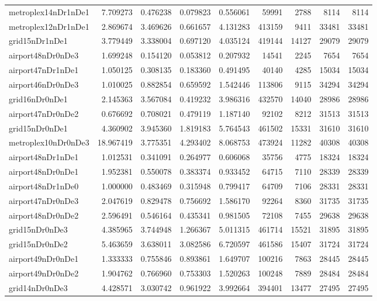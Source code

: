 \begin{longtable}{|l|r|r|r|r|r|r|r|r|}
metroplex14nDr1nDe1 & 7.709273 & 0.476238 & 0.079823 & 0.556061 & 59991 & 2788 & 8114 & 8114 \\
metroplex12nDr1nDe1 & 2.869674 & 3.469626 & 0.661657 & 4.131283 & 413159 & 9411 & 33481 & 33481 \\
grid15nDr1nDe1 & 3.779449 & 3.338004 & 0.697120 & 4.035124 & 419144 & 14127 & 29079 & 29079 \\
airport48nDr0nDe3 & 1.699248 & 0.154120 & 0.053812 & 0.207932 & 14541 & 2245 & 7654 & 7654 \\
airport47nDr1nDe1 & 1.050125 & 0.308135 & 0.183360 & 0.491495 & 40140 & 4285 & 15034 & 15034 \\
airport46nDr0nDe3 & 1.010025 & 0.882854 & 0.659592 & 1.542446 & 113806 & 9115 & 34294 & 34294 \\
grid16nDr0nDe1 & 2.145363 & 3.567084 & 0.419232 & 3.986316 & 432570 & 14040 & 28986 & 28986 \\
airport47nDr0nDe2 & 0.676692 & 0.708021 & 0.479119 & 1.187140 & 92102 & 8212 & 31513 & 31513 \\
grid15nDr0nDe1 & 4.360902 & 3.945360 & 1.819183 & 5.764543 & 461502 & 15331 & 31610 & 31610 \\
metroplex10nDr0nDe3 & 18.967419 & 3.775351 & 4.293402 & 8.068753 & 473924 & 11282 & 40308 & 40308 \\
airport48nDr1nDe1 & 1.012531 & 0.341091 & 0.264977 & 0.606068 & 35756 & 4775 & 18324 & 18324 \\
airport48nDr0nDe1 & 1.952381 & 0.550078 & 0.383374 & 0.933452 & 64715 & 7110 & 28339 & 28339 \\
airport48nDr1nDe0 & 1.000000 & 0.483469 & 0.315948 & 0.799417 & 64709 & 7106 & 28331 & 28331 \\
airport47nDr0nDe3 & 2.047619 & 0.829478 & 0.756692 & 1.586170 & 92264 & 8360 & 31735 & 31735 \\
airport48nDr0nDe2 & 2.596491 & 0.546164 & 0.435341 & 0.981505 & 72108 & 7455 & 29638 & 29638 \\
grid15nDr0nDe3 & 4.385965 & 3.744948 & 1.266367 & 5.011315 & 461714 & 15521 & 31895 & 31895 \\
grid15nDr0nDe2 & 5.463659 & 3.638011 & 3.082586 & 6.720597 & 461586 & 15407 & 31724 & 31724 \\
airport49nDr0nDe1 & 1.333333 & 0.755846 & 0.893861 & 1.649707 & 100216 & 7863 & 28445 & 28445 \\
airport49nDr0nDe2 & 1.904762 & 0.766960 & 0.753303 & 1.520263 & 100248 & 7889 & 28484 & 28484 \\
grid14nDr0nDe3 & 4.428571 & 3.030742 & 0.961922 & 3.992664 & 394401 & 13477 & 27495 & 27495 \\

\end{longtable}
